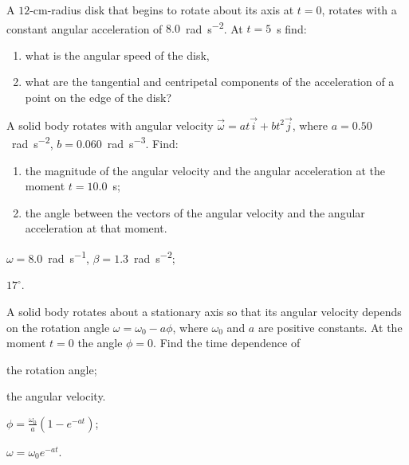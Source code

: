 \begin{problem}
	A $12$-cm-radius disk that begins to rotate about its axis at $t = 0$,
	rotates with a constant angular acceleration of $8.0$~\si{\radian\per\square\second}. At $t = 5$~\si{\second} find:
	\begin{enumerate}[label = (\alph*)]
		\item what is the angular speed of the disk,
		\item  what are
		the tangential and centripetal components of the acceleration of a
		point on the edge of the disk?
	\end{enumerate}
\end{problem}


\begin{problem}
	A solid body rotates with angular velocity $\vec \omega = a t\vec i + b t^2 \vec j$, 
	where $a = 0.50$~\si{\radian\per\square\second}, $b = 0.060$~\si{\radian\per\cubic\second}. Find:
	\begin{enumerate}[label = (\alph*)]
		\item the magnitude of the angular velocity and the angular acceleration 
		at the moment $t = 10.0$~s;
		\item the angle between the vectors of the angular velocity and the 
		angular acceleration at that moment. 
	\end{enumerate} 
	\begin{solution}
		\begin{enumerate*}[label = (\alph*)]
		\item $\omega = 8.0$~\si{\radian\per\second}, $\beta = 1.3$~\si{\radian\per\square\second};
		\item $17^\circ$.
		\end{enumerate*}	
	\end{solution}
\end{problem}


\begin{problem}
	A solid body rotates about a stationary axis so that its angular velocity depends on the rotation angle $\omega = \omega_0 - a\phi$, where 
	$\omega_0$ and $a$ are positive constants. At the moment $t = 0$ the angle 
	$\phi = 0$. Find the time dependence of
	\begin{enumerate*}[label = (\alph*)]
	 	\item the rotation angle; 
	 	\item the angular velocity.
	\end{enumerate*}
	\begin{solution}
		\begin{enumerate*}[label = (\alph*)]
			\item $\phi = \frac{\omega_0}{a}(1- e^{-at})$; 
			\item $\omega = \omega_0e^{-at}$.
		\end{enumerate*}
	\end{solution}
\end{problem}



